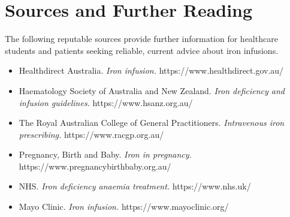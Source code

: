 \section*{Sources and Further Reading}
The following reputable sources provide further information for healthcare students and patients seeking reliable, current advice about iron infusions.
\begin{itemize}
    \item Healthdirect Australia. \textit{Iron infusion.} https://www.healthdirect.gov.au/
    \item Haematology Society of Australia and New Zealand. \textit{Iron deficiency and infusion guidelines.} https://www.hsanz.org.au/
    \item The Royal Australian College of General Practitioners. \textit{Intravenous iron prescribing.} https://www.racgp.org.au/
    \item Pregnancy, Birth and Baby. \textit{Iron in pregnancy.} https://www.pregnancybirthbaby.org.au/
    \item NHS. \textit{Iron deficiency anaemia treatment.} https://www.nhs.uk/
    \item Mayo Clinic. \textit{Iron infusion.} https://www.mayoclinic.org/
\end{itemize}

